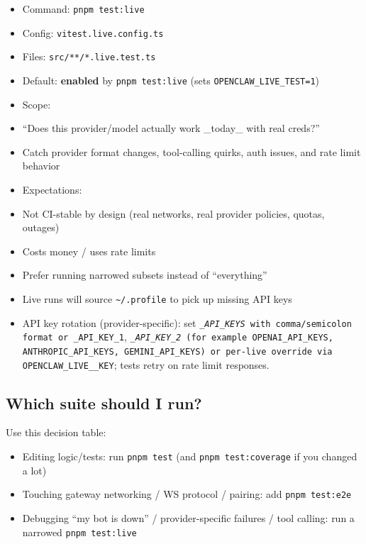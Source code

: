 \begin{itemize}
  \item Command: \texttt{pnpm test:live}
  \item Config: \texttt{vitest.live.config.ts}
  \item Files: \texttt{src/**/*.live.test.ts}
  \item Default: \textbf{enabled} by \texttt{pnpm test:live} (sets \texttt{OPENCLAW\_LIVE\_TEST=1})
  \item Scope:
  \item “Does this provider/model actually work \_today\_ with real creds?”
  \item Catch provider format changes, tool-calling quirks, auth issues, and rate limit behavior
  \item Expectations:
  \item Not CI-stable by design (real networks, real provider policies, quotas, outages)
  \item Costs money / uses rate limits
  \item Prefer running narrowed subsets instead of “everything”
  \item Live runs will source \texttt{\textasciitilde{}/.profile} to pick up missing API keys
  \item API key rotation (provider-specific): set \texttt{\textit{\_API\_KEYS} with comma/semicolon format or \texttt{}\_API\_KEY\_1}, \texttt{\textit{\_API\_KEY\_2} (for example \texttt{OPENAI\_API\_KEYS}, \texttt{ANTHROPIC\_API\_KEYS}, \texttt{GEMINI\_API\_KEYS}) or per-live override via \texttt{OPENCLAW\_LIVE\_}\_KEY}; tests retry on rate limit responses.
\end{itemize}


\subsection{Which suite should I run?}


Use this decision table:

\begin{itemize}
  \item Editing logic/tests: run \texttt{pnpm test} (and \texttt{pnpm test:coverage} if you changed a lot)
  \item Touching gateway networking / WS protocol / pairing: add \texttt{pnpm test:e2e}
  \item Debugging “my bot is down” / provider-specific failures / tool calling: run a narrowed \texttt{pnpm test:live}
\end{itemize}


